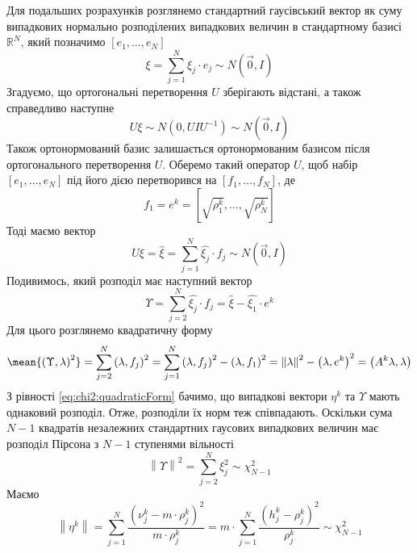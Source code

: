 Для подальших розрахунків розглянемо стандартний гаусівський вектор
як суму випадкових нормально розподілених випадкових величин в стандартному
базисі $\mathbb{R}^N$, який позначимо $\left[ e_1, \dots, e_N \right]$
\begin{equation*}
  \xi = \sum_{j=1}^{N}\xi_j \cdot e_j \sim N\left( \vec{0}, I \right)
\end{equation*}
Згадуємо, що ортогональні перетворення $U$ зберігають відстані, а також
справедливо наступне
\begin{equation*}
  U\xi \sim N\left( 0, U I U^{-1} \right) \sim N\left( \vec{0}, I \right)
\end{equation*}
Також ортонормований базис залишається ортонормованим базисом після
ортогонального перетворення $U$.
Оберемо такий оператор $U$, щоб набір $\left[ e_1, \dots, e_N \right]$ під його
дією перетворився на $\left[ f_1, \dots, f_N \right]$, де
\begin{equation*}
  f_1 = e^k = \left[ \sqrt{\rho_1^k}, \dots, \sqrt{\rho_N^k} \right]
\end{equation*}
Тоді маємо вектор
\begin{equation*}
  U\xi
  = \hat{\xi}
  = \sum_{j=1}^{N} \hat{\xi_j} \cdot f_j \sim N\left( \vec{0}, I \right)
\end{equation*}
Подивимось, який розподіл має наступний вектор
\begin{equation*}
  \Upsilon
  = \sum_{j=2}^{N} \hat{\xi_j} \cdot f_j
  = \hat{\xi} - \hat{\xi_1} \cdot e^k
\end{equation*}
Для цього розглянемо квадратичну форму
\begin{equation*}
  \mean{\left( \Upsilon, \lambda \right)^2}
  = \sum_{j=2}^{N} \left( \lambda, f_j \right)^2
  = \sum_{j=1}^{N} \left( \lambda, f_j \right)^2 - \left( \lambda, f_1 \right)^2
  = \left\| \lambda \right\|^2 - \left( \lambda, e^k \right)^2
  = \left( A^k \lambda, \lambda \right)
\end{equation*}
З рівності \eqref{eq:chi2:quadraticForm} бачимо, що випадкові вектори $\eta^k$
та $\Upsilon$ мають однаковий розподіл.
Отже, розподіли їх норм теж співпадають.
Оскільки сума $N-1$ квадратів незалежних стандартних гаусових випадкових
величин має розподіл Пірсона з $N-1$ ступенями вільності
\begin{equation*}
  \left\| \Upsilon \right\|^2 = \sum_{j=2}^{N} \xi_j^2 \sim \chi_{N-1}^2
\end{equation*}
Маємо
\begin{equation*}
  \left\| \eta^k \right\|
  = \sum_{j=1}^{N}\frac{\left( \nu_j^k - m \cdot \rho_j^k \right)^2}{
    m \cdot \rho_j^k}
  = m \cdot \sum_{j=1}^{N}\frac{\left( h_j^k - \rho_j^k \right)^2}{\rho_j^k}
  \sim \chi_{N-1}^2
\end{equation*}

